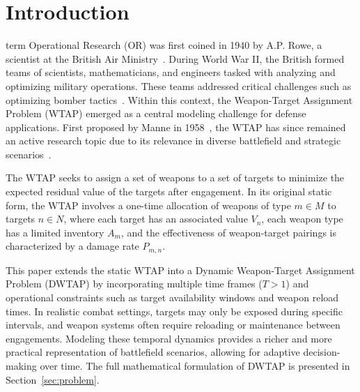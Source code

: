\documentclass[smallcondensed]{svjour3}
\begin{document}
\section{Introduction}
\label{sec:introduction}

 term Operational Research (OR) was first coined in 1940 by A.P. Rowe, a scientist at the British Air Ministry~\cite{kirby2003operational}. During World War II, the British formed teams of scientists, mathematicians, and engineers tasked with analyzing and optimizing military operations. These teams addressed critical challenges such as optimizing bomber tactics~\cite{kirby2003operational}. Within this context, the Weapon-Target Assignment Problem (WTAP) emerged as a central modeling challenge for defense applications. First proposed by Manne in 1958~\cite{manne1958target}, the WTAP has since remained an active research topic due to its relevance in diverse battlefield and strategic scenarios~\cite{ahuja2007exact}.

The WTAP seeks to assign a set of weapons to a set of targets to minimize the expected residual value of the targets after engagement. In its original static form, the WTAP involves a one-time allocation of weapons of type $m \in M$ to targets $n \in N$, where each target has an associated value $V_n$, each weapon type has a limited inventory $A_m$, and the effectiveness of weapon-target pairings is characterized by a damage rate $P_{m,n}$.

This paper extends the static WTAP into a Dynamic Weapon-Target Assignment Problem (DWTAP) by incorporating multiple time frames ($T > 1$) and operational constraints such as target availability windows and weapon reload times. In realistic combat settings, targets may only be exposed during specific intervals, and weapon systems often require reloading or maintenance between engagements. Modeling these temporal dynamics provides a richer and more practical representation of battlefield scenarios, allowing for adaptive decision-making over time. The full mathematical formulation of DWTAP is presented in Section~\ref{sec:problem}.

\end{document}

